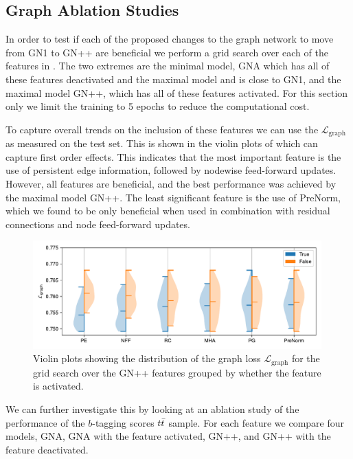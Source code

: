 \subsection{Graph Ablation Studies}

In order to test if each of the proposed changes to the graph network to move from GN1 to GN++ are beneficial we perform a grid search over each of the features in .
The two extremes are the minimal model, GNA which has all of these features deactivated and the maximal model and is close to GN1, and the maximal model GN++, which has all of these features activated.
For this section only we limit the training to 5 epochs to reduce the computational cost.

To capture overall trends on the inclusion of these features we can use the $\mathcal{L}_{\text{graph}}$ as measured on the test set.
This is shown in the violin plots of  which can capture first order effects.
This indicates that the most important feature is the use of persistent edge information, followed by nodewise feed-forward updates.
However, all features are beneficial, and the best performance was achieved by the maximal model GN++.
The least significant feature is the use of PreNorm, which we found to be only beneficial when used in combination with residual connections and node feed-forward updates.

\begin{figure}[ht]
    \centering
    \includegraphics[width=0.99\textwidth]{figures/flavour_tagging/violin.pdf}
    \caption{Violin plots showing the distribution of the graph loss $\mathcal{L}_{\text{graph}}$ for the grid search over the GN++ features grouped by whether the feature is activated.}
    \label{fig:violin}
\end{figure}

We can further investigate this by looking at an ablation study of the performance of the $b$-tagging scores $t\bar{t}$ sample.
For each feature we compare four models, GNA, GNA with the feature activated, GN++, and GN++ with the feature deactivated.

